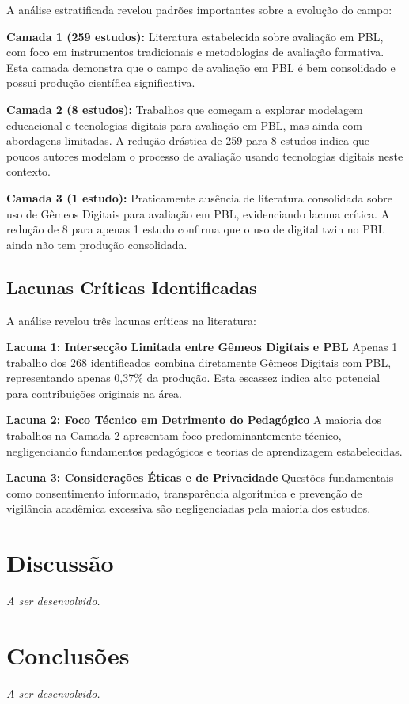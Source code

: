\documentclass[english, spanish, brazilian]{RBIEarticle} %
\begin{document}
A análise estratificada revelou padrões importantes sobre a evolução do campo:

\textbf{Camada 1 (259 estudos):} Literatura estabelecida sobre avaliação em PBL, com foco em instrumentos tradicionais e metodologias de avaliação formativa. Esta camada demonstra que o campo de avaliação em PBL é bem consolidado e possui produção científica significativa.

\textbf{Camada 2 (8 estudos):} Trabalhos que começam a explorar modelagem educacional e tecnologias digitais para avaliação em PBL, mas ainda com abordagens limitadas. A redução drástica de 259 para 8 estudos indica que poucos autores modelam o processo de avaliação usando tecnologias digitais neste contexto.

\textbf{Camada 3 (1 estudo):} Praticamente ausência de literatura consolidada sobre uso de Gêmeos Digitais para avaliação em PBL, evidenciando lacuna crítica. A redução de 8 para apenas 1 estudo confirma que o uso de digital twin no PBL ainda não tem produção consolidada.

\subsection{Lacunas Críticas Identificadas}

A análise revelou três lacunas críticas na literatura:

\textbf{Lacuna 1: Intersecção Limitada entre Gêmeos Digitais e PBL}
Apenas 1 trabalho dos 268 identificados combina diretamente Gêmeos Digitais com PBL, representando apenas 0,37\% da produção. Esta escassez indica alto potencial para contribuições originais na área.

\textbf{Lacuna 2: Foco Técnico em Detrimento do Pedagógico}
A maioria dos trabalhos na Camada 2 apresentam foco predominantemente técnico, negligenciando fundamentos pedagógicos e teorias de aprendizagem estabelecidas.

\textbf{Lacuna 3: Considerações Éticas e de Privacidade}
Questões fundamentais como consentimento informado, transparência algorítmica e prevenção de vigilância acadêmica excessiva são negligenciadas pela maioria dos estudos.

\section{Discussão}

\textit{A ser desenvolvido.}

\section{Conclusões}

\textit{A ser desenvolvido.}


\printbibliography
\end{document}
